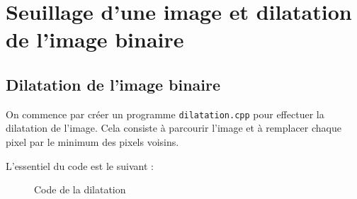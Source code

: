 \documentclass[french,a4paper,10pt]{article}
\begin{document}
	\newpage
	\section{Seuillage d'une image et dilatation de l'image binaire}\label{sec:2}

	\subsection{Dilatation de l'image binaire}\label{subsec:2.1}

	On commence par créer un programme \texttt{dilatation.cpp} pour effectuer la dilatation de l'image.
	Cela consiste à parcourir l'image et à remplacer chaque pixel par le minimum des pixels voisins.

	L'essentiel du code est le suivant : %
	\begin{figure}[!htb]
		\centering
		\caption{Code de la dilatation}\label{fig:dilatation-code}
	\end{figure}
\end{document}
